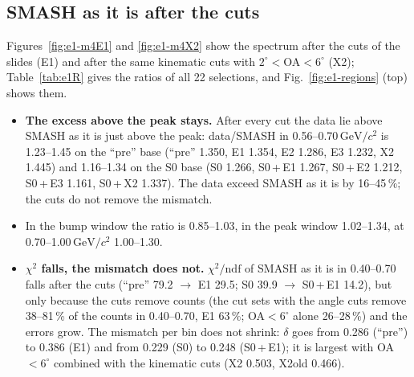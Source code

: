 \documentclass[11pt,a4paper]{article}
\newcommand{\GeVcc}{\ensuremath{\mathrm{GeV}/c^{2}}\xspace}
\newcommand{\cs}[1]{\textsf{#1}}%
\begin{document}
\subsection{SMASH as it is after the cuts}
\label{sec:e1asis}
Figures~\ref{fig:e1-m4E1} and \ref{fig:e1-m4X2} show the spectrum after the cuts of the slides (\cs{E1}) and after the same kinematic cuts
with $2^\circ<$OA$<6^\circ$ (\cs{X2}); Table~\ref{tab:e1R} gives the ratios of all 22 selections, and Fig.~\ref{fig:e1-regions} (top) shows them.
\begin{itemize}\setlength{\itemsep}{1pt}
\item \textbf{The excess above the peak stays.} After every cut the data lie above SMASH as it is just above the peak: data/SMASH in
      0.56--0.70\,\GeVcc is 1.23--1.45 on the ``pre'' base (``pre'' 1.350, \cs{E1} 1.354, \cs{E2} 1.286, \cs{E3} 1.232, \cs{X2} 1.445) and
      1.16--1.34 on the S0 base (S0 1.266, S0\,+\,\cs{E1} 1.267, S0\,+\,\cs{E2} 1.212, S0\,+\,\cs{E3} 1.161, S0\,+\,\cs{X2} 1.337). The data exceed
      SMASH as it is by 16--45\,\%; the cuts do not remove the mismatch.
\item In the bump window the ratio is 0.85--1.03, in the peak window 1.02--1.34, at 0.70--1.00\,\GeVcc 1.00--1.30.
\item \textbf{$\chi^2$ falls, the mismatch does not.} $\chi^2/\mathrm{ndf}$ of SMASH as it is in 0.40--0.70 falls after the cuts (``pre'' 79.2
      $\to$ \cs{E1} 29.5; S0 39.9 $\to$ S0\,+\,\cs{E1} 14.2), but only because the cuts remove counts (the cut sets with the angle cuts remove 38--81\,\% of the counts
      in 0.40--0.70, \cs{E1} 63\,\%; OA$<6^\circ$ alone 26--28\,\%) and the errors grow. The mismatch per bin does not shrink: $\delta$ goes from
      0.286 (``pre'') to 0.386 (\cs{E1}) and from 0.229 (S0) to 0.248 (S0\,+\,\cs{E1}); it is largest with OA$<6^\circ$ combined with the kinematic
      cuts (\cs{X2} 0.503, \cs{X2old} 0.466).
\end{itemize}
\end{document}
